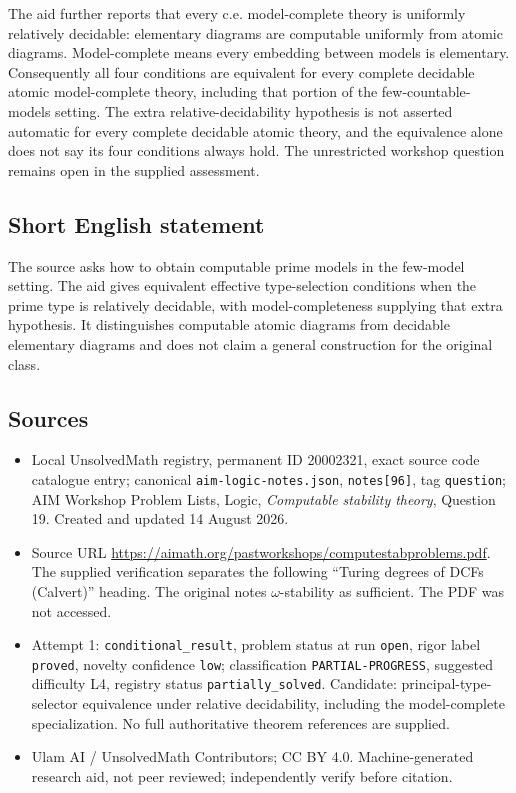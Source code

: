 \documentclass[11pt]{article}
\begin{document}
The aid further reports that every c.e. model-complete theory is uniformly relatively decidable: elementary diagrams are computable uniformly from atomic diagrams. Model-complete means every embedding between models is elementary. Consequently all four conditions are equivalent for every complete decidable atomic model-complete theory, including that portion of the few-countable-models setting. The extra relative-decidability hypothesis is not asserted automatic for every complete decidable atomic theory, and the equivalence alone does not say its four conditions always hold. The unrestricted workshop question remains open in the supplied assessment.
\subsection{Short English statement}
The source asks how to obtain computable prime models in the few-model setting. The aid gives equivalent effective type-selection conditions when the prime type is relatively decidable, with model-completeness supplying that extra hypothesis. It distinguishes computable atomic diagrams from decidable elementary diagrams and does not claim a general construction for the original class.
\subsection{Sources}
\begin{itemize}
\item Local UnsolvedMath registry, permanent ID 20002321, exact source code catalogue entry; canonical \texttt{aim-logic-notes.json}, \texttt{notes[96]}, tag \texttt{question}; AIM Workshop Problem Lists, Logic, \emph{Computable stability theory}, Question 19. Created and updated 14 August 2026.
\item Source URL \url{https://aimath.org/pastworkshops/computestabproblems.pdf}. The supplied verification separates the following ``Turing degrees of DCFs (Calvert)'' heading. The original notes \(\omega\)-stability as sufficient. The PDF was not accessed.
\item Attempt 1: \texttt{conditional\_result}, problem status at run \texttt{open}, rigor label \texttt{proved}, novelty confidence \texttt{low}; classification \texttt{PARTIAL-PROGRESS}, suggested difficulty L4, registry status \texttt{partially\_solved}. Candidate: principal-type-selector equivalence under relative decidability, including the model-complete specialization. No full authoritative theorem references are supplied.
\item Ulam AI / UnsolvedMath Contributors; CC BY 4.0. Machine-generated research aid, not peer reviewed; independently verify before citation.
\end{itemize}
\end{document}
